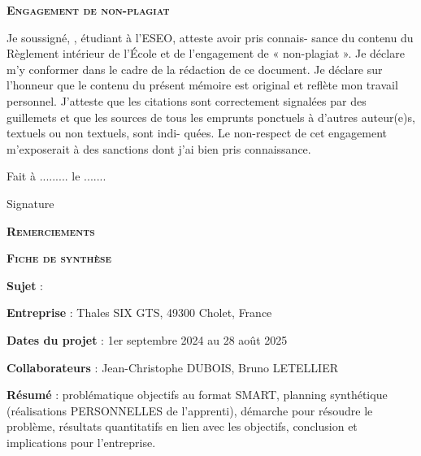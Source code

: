 

\large{\textsc{\textbf{Engagement de non-plagiat}}}
\vspace*{0.5cm}

Je soussigné, \Author, étudiant à l'ESEO, atteste avoir pris connais-
sance du contenu du Règlement intérieur de l'École et de l'engagement de « non-plagiat
». Je déclare m'y conformer dans le cadre de la rédaction de ce document. Je déclare sur
l'honneur que le contenu du présent mémoire est original et reflète mon travail personnel.
J'atteste que les citations sont correctement signalées par des guillemets et que les sources
de tous les emprunts ponctuels à d'autres auteur(e)s, textuels ou non textuels, sont indi-
quées. Le non-respect de cet engagement m'exposerait à des sanctions dont j'ai bien pris
connaissance.

Fait à ......... le .......

Signature

\newpage


\large{\textsc{\textbf{Remerciements}}}
\vspace*{0.5cm}

\newpage


\vspace*{1cm}
\tableofcontents

\newpage


\large{\textsc{\textbf{Fiche de synthèse}}}
\vspace*{0.5cm}

\textbf{Sujet} : \Subject

\textbf{Entreprise} : Thales SIX GTS, 49300 Cholet, France

\textbf{Dates du projet} : 1er septembre 2024 au 28 août 2025

\textbf{Collaborateurs} : Jean-Christophe DUBOIS, Bruno LETELLIER

\vspace*{0.5cm}

\textbf{Résumé} : problématique objectifs au format SMART, planning synthétique (réalisations PERSONNELLES de l'apprenti), démarche pour résoudre le problème, résultats quantitatifs en lien avec les objectifs, conclusion et implications pour l'entreprise.

